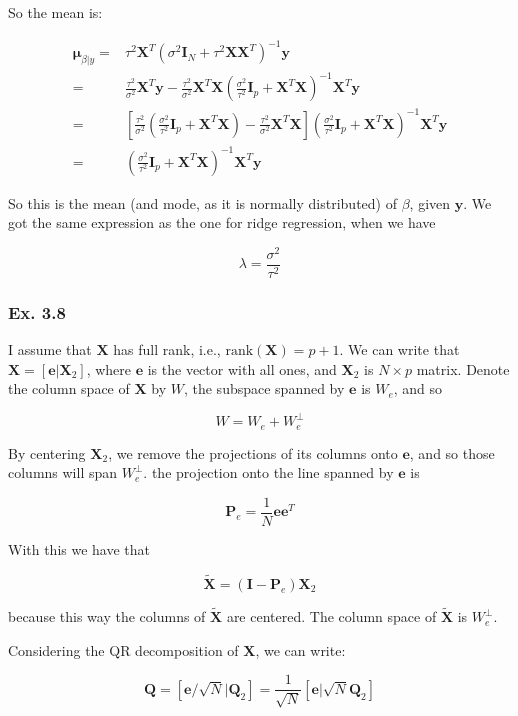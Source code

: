 \documentclass{article}
\begin{document}
So the mean is:

\[
\begin{split}
\bm{\mu}_{\beta|y} =& \tau^2 \bm{X}^T (\sigma^2 \bm{I}_N + \tau^2 \bm{X} \bm{X}^T)^{-1}\bm{y}\\
=& \frac{\tau^2}{\sigma^2} \bm{X}^T\bm{y} - \frac{\tau^2}{\sigma^2}\bm{X}^T \bm{X}\left(\frac{\sigma^2}{\tau^2}\bm{I}_p + \bm{X}^T\bm{X}\right)^{-1}\bm{X}^T\bm{y}\\
=& \left[\frac{\tau^2}{\sigma^2} \left(\frac{\sigma^2}{\tau^2}\bm{I}_p + \bm{X}^T\bm{X}\right) - \frac{\tau^2}{\sigma^2}\bm{X}^T \bm{X}\right]\left(\frac{\sigma^2}{\tau^2}\bm{I}_p + \bm{X}^T\bm{X}\right)^{-1}\bm{X}^T\bm{y}\\
=& \left(\frac{\sigma^2}{\tau^2}\bm{I}_p + \bm{X}^T\bm{X}\right)^{-1}\bm{X}^T\bm{y}
\end{split}
\]

So this is the mean (and mode, as it is normally distributed) of $\beta$, given $\mathbf{y}$. We got the same expression as the one for ridge regression, when we have

\[
\lambda = \frac{\sigma^2}{\tau^2}
\]


\subsubsection{Ex. 3.8}

I assume that $\bm{X}$ has full rank, i.e., $\text{rank}(\bm{X}) = p+1$. We can write that $\bm{X} = [\bm{e} | \bm{X}_2]$, where $\bm{e}$ is the vector with all ones, and $\bm{X}_2$ is $N\times p$ matrix. Denote the column space of $\bm{X}$ by $W$, the subspace spanned by $\bm{e}$ is $W_e$, and so

\[
W = W_e + W_e^{\perp}
\]

By centering $\bm{X}_2$, we remove the projections of its columns onto $\bm{e}$, and so those columns will span $W_e^{\perp}$. the projection onto the line spanned by $\bm{e}$ is

\[
\bm{P}_e = \frac1N \bm{e}\bm{e}^T
\]

With this we have that

\[
\tilde{\bm{X}} = (\bm{I} - \bm{P}_e) \bm{X}_2
\]

because this way the columns of $\tilde{\bm{X}}$ are centered. The column space of $\tilde{\bm{X}}$ is $W_e^{\perp}$.

Considering the QR decomposition of $\bm{X}$, we can write:

\[
\bm{Q} = [\bm{e}/\sqrt{N} | \bm{Q}_2] = \frac{1}{\sqrt{N}} [\bm{e} | \sqrt{N} \bm{Q}_2]
\]
\end{document}
